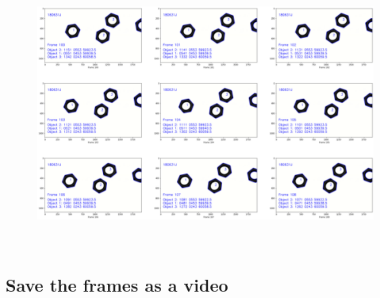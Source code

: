 \documentclass[a4paper,11pt]{article}%
\begin{document}
    \begin{figure}[!h]
		\centering
    \includegraphics[scale=0.3]{figures/output_43_0.png}
    \end{figure}
    { \hspace*{\fill} \\}
\pagebreak
    \hypertarget{save-the-frames-as-a-video}{%
\subsection{Save the frames as a
video}\label{save-the-frames-as-a-video}}
\end{document}
